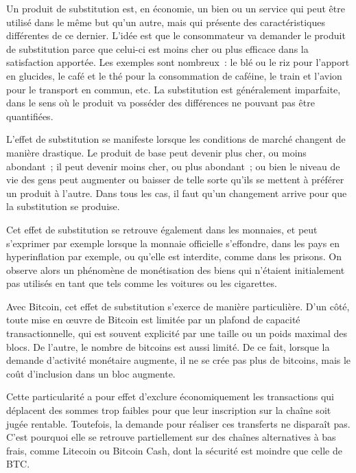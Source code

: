 
Un produit de substitution est, en économie, un bien ou un service qui peut être utilisé dans le même but qu'un autre, mais qui présente des caractéristiques différentes de ce dernier. L'idée est que le consommateur va demander le produit de substitution parce que celui-ci est moins cher ou plus efficace dans la satisfaction apportée. Les exemples sont nombreux~: le blé ou le riz pour l'apport en glucides, le café et le thé pour la consommation de caféine, le train et l'avion pour le transport en commun, etc. La substitution est généralement imparfaite, dans le sens où le produit va posséder des différences ne pouvant pas être quantifiées.

L'effet de substitution se manifeste lorsque les conditions de marché changent de manière drastique. Le produit de base peut devenir plus cher, ou moins abondant~; il peut devenir moins cher, ou plus abondant~; ou bien le niveau de vie des gens peut augmenter ou baisser de telle sorte qu'ils se mettent à préférer un produit à l'autre. Dans tous les cas, il faut qu'un changement arrive pour que la substitution se produise.

Cet effet de substitution se retrouve également dans les monnaies, et peut s'exprimer par exemple lorsque la monnaie officielle s'effondre, dans les pays en hyperinflation par exemple, ou qu'elle est interdite, comme dans les prisons. On observe alors un phénomène de monétisation des biens qui n'étaient initialement pas utilisés en tant que tels comme les voitures ou les cigarettes.

Avec Bitcoin, cet effet de substitution s'exerce de manière particulière. D'un côté, toute mise en œuvre de Bitcoin est limitée par un plafond de capacité transactionnelle, qui est souvent explicité par une taille ou un poids maximal des blocs. De l'autre, le nombre de bitcoins est aussi limité. De ce fait, lorsque la demande d'activité monétaire augmente, il ne se crée pas plus de bitcoins, mais le coût d'inclusion dans un bloc augmente.

Cette particularité a pour effet d'exclure économiquement les transactions qui déplacent des sommes trop faibles pour que leur inscription sur la chaîne soit jugée rentable. Toutefois, la demande pour réaliser ces transferts ne disparaît pas. C'est pourquoi elle se retrouve partiellement sur des chaînes alternatives à bas frais, comme Litecoin ou Bitcoin Cash, dont la sécurité est moindre que celle de BTC.

